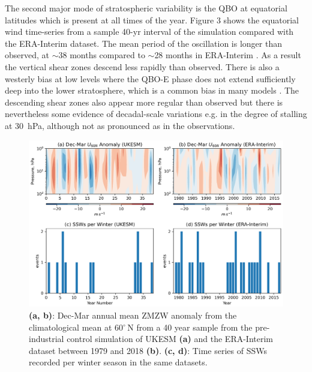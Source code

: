 The second major mode of stratospheric variability is the QBO at equatorial latitudes which is present at all times of the year. Figure 3 shows the equatorial wind time-series from a sample 40-yr interval of the simulation compared with the ERA-Interim dataset. The mean period of the oscillation is longer than observed, at $\sim$38 months compared to $\sim$28 months in ERA-Interim \citep{Kawatani2016}. As a result the vertical shear zones descend less rapidly than observed. There is also a westerly bias at low levels where the QBO-E phase does not extend sufficiently deep into the lower stratosphere, which is a common bias in many models \citep{Bushell2020}. The descending shear zones also appear more regular than observed but there is nevertheless some evidence of decadal-scale variations e.g. in the degree of stalling at 30\ hPa, although not as pronounced as in the observations.

\begin{figure}[h!]
\begin{center}
\noindent\includegraphics[width = \linewidth]{Figures/Figures-origins/SSW_series_ERA_UKESM.png}
\caption[Vortex ZMZW and SSW time series from ERA-Interim]{\textbf{(a, b)}: Dec-Mar annual mean ZMZW anomaly from the climatological mean at 60$^\circ$\,N from a 40 year sample from the pre-industrial control simulation of UKESM \textbf{(a)} and the ERA-Interim dataset between 1979 and 2018 \textbf{(b)}. \textbf{(c, d)}: Time series of SSWs recorded per winter season in the same datasets.}
\label{fig:SSW_series_sample}
\end{center}
\end{figure}



